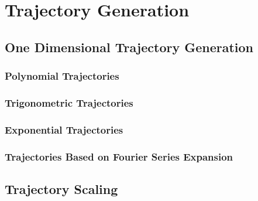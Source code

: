 \section{Trajectory Generation}

	\subsection{One Dimensional Trajectory Generation}

		\subsubsection{Polynomial Trajectories}

		\subsubsection{Trigonometric Trajectories}

		\subsubsection{Exponential Trajectories}

		\subsubsection{Trajectories Based on Fourier Series Expansion}

	\subsection{Trajectory Scaling}

